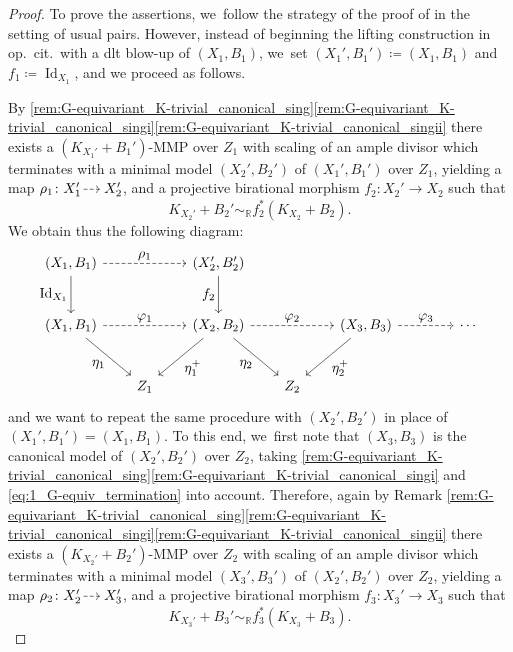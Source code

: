 \documentclass[JEP,XML,SOM,Unicode,published]{cedram}
\let\ts\textstyle
\newcommand{\dradpl}{{\hspace*{-2.5mm}\begin{tikzcd}[ampersand replacement=\&,column sep = scriptsize]\mbox{}\ar[r,dashed]\&\mbox{}\end{tikzcd}\hspace*{-2.5mm}}}
\newcommand{\dratst}{{\hspace*{-2.5mm}\begin{tikzcd}[ampersand replacement=\&,column sep = small]\mbox{}\ar[r,dashed]\&\mbox{}\end{tikzcd}\hspace*{-2mm}}}
\let\drascst\dratst
\newcommand{\dra}{\mathchoice{\dradpl}{\dratst}{\drascst}{\drascst}}
\theoremstyle{plain}
\theoremstyle{definition}
\newcommand{\R}{\mathbb{R}}
\DeclareMathOperator{\Id}{Id}
\begin{document}
\begin{proof}
To prove the assertions, we~follow the strategy of the proof of \cite[Th.\,3.2]{TX24} in the setting of usual pairs. However, instead of beginning the lifting construction in op.\ cit.\ with a dlt blow-up of $(X_1,B_1)$, we~set $(X_1', B_1') \coloneqq (X_1,B_1)$ and $f_1 \coloneqq \Id_{X_1}$, and we proceed as follows.

By \autoref{rem:G-equivariant_K-trivial_canonical_sing}\eqref{rem:G-equivariant_K-trivial_canonical_singi}\eqref{rem:G-equivariant_K-trivial_canonical_singii} there exists a $ (K_{X_1'} + B_1') $-MMP over $Z_1$ with scaling of an ample divisor which terminates with a minimal model $ (X_2',B_2') $ of $ (X_1',B_1') $ over $Z_1$, yielding a map $ \rho_1 \colon X_1' \dra X_2' $, and a projective birational morphism $ f_2 \colon X_2' \to X_2 $ such that
\begin{equation}
\label{eq:1_G-equiv_termination}
K_{X_2'} + B_2' \sim_\R f_2^* (K_{X_2} + B_2).
\end{equation}
We obtain thus the following diagram:
\[
\begin{tikzcd}[column sep = 2em, row sep = large]
(X_1,B_1) \arrow[d, "\ts \Id_{X_1}" swap] \arrow[rr, dashed, "\ts \rho_1"] && (X_2',B_2') \arrow[d, "\ts f_2" swap]
\\
(X_1,B_1) \arrow[dr, "\ts \eta_1" swap] \arrow[rr, dashed, "\ts \varphi_1"] && (X_2,B_2) \arrow[dl, "\ts \eta_1^+"] \arrow[dr, "\ts \eta_2" swap] \arrow[rr, dashed, "\ts \varphi_2"] && (X_3,B_3) \arrow[dl, "\ts \eta_2^+"] \arrow[rr, dashed, "\ts \varphi_3"] && \cdots
\\
& Z_1 && Z_2
\end{tikzcd}
\]
and we want to repeat the same procedure with $(X_2',B_2')$ in place of $(X_1',B_1') = (X_1,B_1)$. To this end, we~first note that $(X_3,B_3)$ is the canonical model of $(X_2', B_2')$ over $Z_2$, taking \autoref{rem:G-equivariant_K-trivial_canonical_sing}\eqref{rem:G-equivariant_K-trivial_canonical_singi} and \eqref{eq:1_G-equiv_termination} into account. Therefore, again by Remark \ref{rem:G-equivariant_K-trivial_canonical_sing}\eqref{rem:G-equivariant_K-trivial_canonical_singi}\eqref{rem:G-equivariant_K-trivial_canonical_singii} there exists a $ (K_{X_2'} + B_2') $-MMP over $Z_2$ with scaling of an ample divisor which terminates with a minimal model $ (X_3',B_3') $ of $ (X_2',B_2') $ over $Z_2$, yielding a map $\rho_2 \colon X_2' \dra X_3'$, and a projective birational morphism $ f_3 \colon X_3' \to X_3 $ such that
\[
K_{X_3'} + B_3' \sim_\R f_3^* (K_{X_3} + B_3).
\]


\end{proof}
\end{document}
